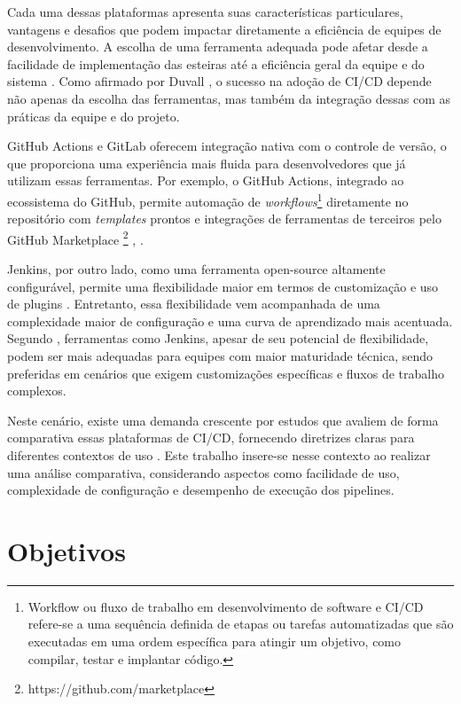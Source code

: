 Cada uma dessas plataformas apresenta suas características particulares, vantagens e desafios que podem impactar diretamente a eficiência de equipes de desenvolvimento. A escolha de uma ferramenta adequada pode afetar desde a facilidade de implementação das esteiras até a eficiência geral da equipe e do sistema \cite{GitlabHowToChoose}. Como afirmado por Duvall \cite{Duvall2007}, o sucesso na adoção de CI/CD depende não apenas da escolha das ferramentas, mas também da integração dessas com as práticas da equipe e do projeto.

GitHub Actions e GitLab oferecem integração nativa com o controle de versão, o que proporciona uma experiência mais fluida para desenvolvedores que já utilizam essas ferramentas. Por exemplo, o GitHub Actions, integrado ao ecossistema do GitHub, permite automação de \textit{workflows}\footnote{Workflow ou fluxo de trabalho em desenvolvimento de software e CI/CD refere-se a uma sequência definida de etapas ou tarefas automatizadas que são executadas em uma ordem específica para atingir um objetivo, como compilar, testar e implantar código.} diretamente no repositório com \textit{templates} prontos e integrações de ferramentas de terceiros pelo GitHub Marketplace \footnote{https://github.com/marketplace} \cite{GitHubActionsOverview}, \cite{GetStartedWithGitLab}.  

Jenkins, por outro lado, como uma ferramenta open-source altamente configurável, permite uma flexibilidade maior em termos de customização e uso de plugins \cite{JenkinsDocumentation}. Entretanto, essa flexibilidade vem acompanhada de uma complexidade maior de configuração e uma curva de aprendizado mais acentuada. Segundo \cite{RiunguKalliosaari2016}, ferramentas como Jenkins, apesar de seu potencial de flexibilidade, podem ser mais adequadas para equipes com maior maturidade técnica, sendo preferidas em cenários que exigem customizações específicas e fluxos de trabalho complexos.

Neste cenário, existe uma demanda crescente por estudos que avaliem de forma comparativa essas plataformas de CI/CD, fornecendo diretrizes claras para diferentes contextos de uso \cite{Shahin2017}. Este trabalho insere-se nesse contexto ao realizar uma análise comparativa, considerando aspectos como facilidade de uso, complexidade de configuração e desempenho de execução dos pipelines.

\section{Objetivos}\label{sec:objetivos}

